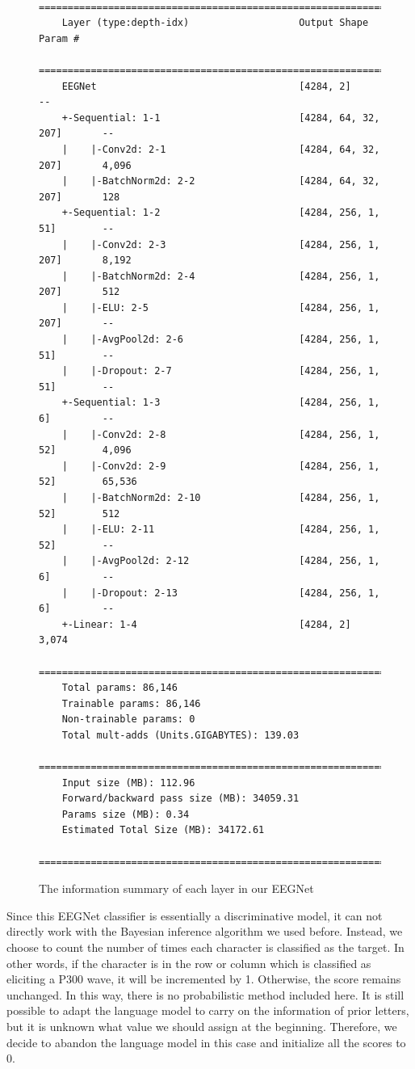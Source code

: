 \documentclass{article}
\begin{document}
\begin{figure}[H]
\scriptsize
\centering
\begin{BVerbatim}
	==========================================================================================
	Layer (type:depth-idx)                   Output Shape              Param #
	==========================================================================================
	EEGNet                                   [4284, 2]                 --
	+-Sequential: 1-1                        [4284, 64, 32, 207]       --
	|    |-Conv2d: 2-1                       [4284, 64, 32, 207]       4,096
	|    |-BatchNorm2d: 2-2                  [4284, 64, 32, 207]       128
	+-Sequential: 1-2                        [4284, 256, 1, 51]        --
	|    |-Conv2d: 2-3                       [4284, 256, 1, 207]       8,192
	|    |-BatchNorm2d: 2-4                  [4284, 256, 1, 207]       512
	|    |-ELU: 2-5                          [4284, 256, 1, 207]       --
	|    |-AvgPool2d: 2-6                    [4284, 256, 1, 51]        --
	|    |-Dropout: 2-7                      [4284, 256, 1, 51]        --
	+-Sequential: 1-3                        [4284, 256, 1, 6]         --
	|    |-Conv2d: 2-8                       [4284, 256, 1, 52]        4,096
	|    |-Conv2d: 2-9                       [4284, 256, 1, 52]        65,536
	|    |-BatchNorm2d: 2-10                 [4284, 256, 1, 52]        512
	|    |-ELU: 2-11                         [4284, 256, 1, 52]        --
	|    |-AvgPool2d: 2-12                   [4284, 256, 1, 6]         --
	|    |-Dropout: 2-13                     [4284, 256, 1, 6]         --
	+-Linear: 1-4                            [4284, 2]                 3,074
	==========================================================================================
	Total params: 86,146
	Trainable params: 86,146
	Non-trainable params: 0
	Total mult-adds (Units.GIGABYTES): 139.03
	==========================================================================================
	Input size (MB): 112.96
	Forward/backward pass size (MB): 34059.31
	Params size (MB): 0.34
	Estimated Total Size (MB): 34172.61
	==========================================================================================
\end{BVerbatim}
\caption{The information summary of each layer in our EEGNet}
\label{fig:6}
\end{figure}

\vspace{-3mm}
Since this EEGNet classifier is essentially a discriminative model, it can not directly work with the Bayesian inference algorithm we used before. Instead, we choose to count the number of times each character is classified as the target. In other words, if the character is in the row or column which is classified as eliciting a P300 wave, it will be incremented by 1. Otherwise, the score remains unchanged. In this way, there is no probabilistic method included here. It is still possible to adapt the language model to carry on the information of prior letters, but it is unknown what value we should assign at the beginning. Therefore, we decide to abandon the language model in this case and initialize all the scores to $0$.
\end{document}
